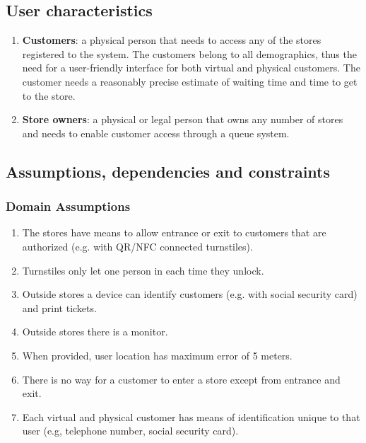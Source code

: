 \subsection{User characteristics}
\begin{enumerate}
	\item {\bfseries Customers}: a physical person that needs to access any of the stores registered to the system. The customers belong to all demographics, thus the need for a user-friendly interface for both virtual and physical customers. The customer needs a reasonably precise estimate of waiting time and time to get to the store.
	\item {\bfseries Store owners}: a physical or legal person that owns any number of stores and needs to enable customer access through a queue system.
\end{enumerate}

\subsection{Assumptions, dependencies and constraints}
\subsubsection{Domain Assumptions}
\begin{enumerate}[label=D\arabic*]
	\item The stores have means to allow entrance or exit to customers that are authorized (e.g. with QR/NFC connected turnstiles).
	\item Turnstiles only let one person in each time they unlock.
	\item Outside stores a device can identify customers (e.g. with social security card) and print tickets.
	\item Outside stores there is a monitor.
	\item When provided, user location has maximum error of 5 meters.
	\item There is no way for a customer to enter a store except from entrance and exit.
	\item Each virtual and physical customer has means of identification unique to that user (e.g, telephone number, social security card).
\end{enumerate}